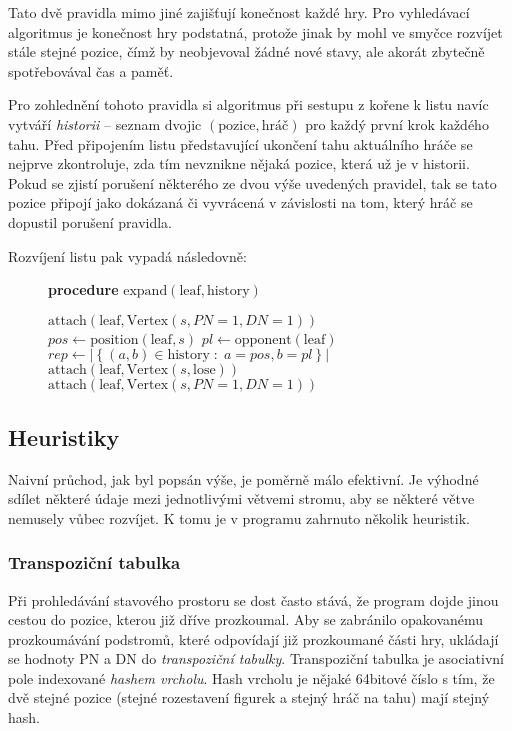 \documentclass{article}
\begin{document}
Tato dvě pravidla mimo jiné zajišťují konečnost každé hry. Pro vyhledávací
algoritmus je konečnost hry podstatná, protože jinak by mohl ve smyčce rozvíjet 
stále stejné pozice, čímž by neobjevoval žádné nové stavy, ale akorát zbytečně
spotřebovával čas a paměť.

Pro zohlednění tohoto pravidla si algoritmus při sestupu z kořene k listu navíc
vytváří \emph{historii} -- seznam dvojic $(\text{pozice}, \text{hráč})$ pro 
každý první krok každého tahu. Před připojením listu představující ukončení tahu
aktuálního hráče se nejprve zkontroluje, zda tím nevznikne nějaká pozice, která
už je v historii. Pokud se zjistí porušení některého ze dvou výše uvedených 
pravidel, tak se tato pozice připojí jako dokázaná či vyvrácená v závislosti
na tom, který hráč se dopustil porušení pravidla.

Rozvíjení listu pak vypadá následovně:
\begin{figure}[H]
{\bf procedure} $\text{expand}(\text{leaf}, \text{history})$
\begin{algorithmic}
    \STATE $\text{attach}(\text{leaf}, \text{Vertex}(s, PN=1, DN=1))$
  \ELSE
    \STATE $pos \gets \text{position}(\text{leaf}, s)$
    \STATE $pl \gets \text{opponent}(\text{leaf})$
    \STATE $rep \gets \left|\left\{ (a, b) \in \text{history} \;:\; 
                                    a = pos, b = pl \right\}\right|$
      \STATE $\text{attach}(\text{leaf}, \text{Vertex}(s, \text{lose}))$
    \ELSE
      \STATE $\text{attach}(\text{leaf}, \text{Vertex}(s, PN=1, DN=1))$
    \ENDIF
  \ENDIF
\ENDFOR
\end{algorithmic}
\end{figure}

\subsection{Heuristiky}
\label{sec:heuristics}
Naivní průchod, jak byl popsán výše, je poměrně málo efektivní. Je výhodné
sdílet některé údaje mezi jednotlivými větvemi stromu, aby se některé větve
nemusely vůbec rozvíjet. K tomu je v programu zahrnuto několik heuristik.

\subsubsection{Transpoziční tabulka}
\label{sec:heur-tt}
Při prohledávání stavového prostoru se dost často stává, že program dojde jinou
cestou do pozice, kterou již dříve prozkoumal. Aby se zabránilo opakovanému
prozkoumávání podstromů, které odpovídají již prozkoumané části hry, ukládají
se hodnoty PN a DN do \emph{transpoziční tabulky}. Transpoziční tabulka je
asociativní pole indexované \emph{hashem vrcholu}. Hash vrcholu je nějaké
64bitové číslo s tím, že dvě stejné pozice (stejné rozestavení figurek a stejný
hráč na tahu) mají stejný hash.
\end{document}
